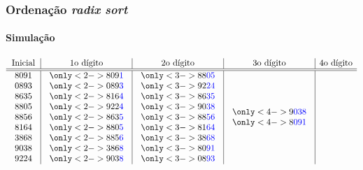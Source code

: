 \documentclass{beamer}
\begin{document}
\begin{frame}
  \frametitle{Ordenação \textit{radix sort\/}}
  \framesubtitle{Simulação}

  $$
  \begin{array}{c|c|c|c|c}
    \mbox{Inicial} & \mbox{1o dígito} & \mbox{2o dígito} & \mbox{3o dígito} & \mbox{4o dígito} \\
    \hline
    \hline
    \begin{array}{c}
      8091 \\
      0893 \\
      8635 \\
      8805 \\
      8856 \\
      8164 \\
    3868 \\
    9038 \\
    9224
  \end{array}
    &
  \begin{array}{c}
    \only<2->{809\assert{1}} \\
    \only<2->{089\assert{3}} \\
    \only<2->{816\assert{4}} \\
    \only<2->{922\assert{4}} \\
    \only<2->{863\assert{5}} \\
    \only<2->{880\assert{5}} \\
    \only<2->{885\assert{6}} \\
    \only<2->{386\assert{8}} \\
    \only<2->{903\assert{8}}
  \end{array}
  &
  \begin{array}{c}
    \only<3->{88\assert{05}} \\
    \only<3->{92\assert{24}} \\
    \only<3->{86\assert{35}} \\
    \only<3->{90\assert{38}} \\
    \only<3->{88\assert{56}} \\
    \only<3->{81\assert{64}} \\
    \only<3->{38\assert{68}} \\
    \only<3->{80\assert{91}} \\
    \only<3->{08\assert{93}}
  \end{array}
  &
  \begin{array}{c}
    \only<4->{9\assert{038}} \\
    \only<4->{8\assert{091}} \\

\end{array}
\end{array}$$
\end{frame}
\end{document}
